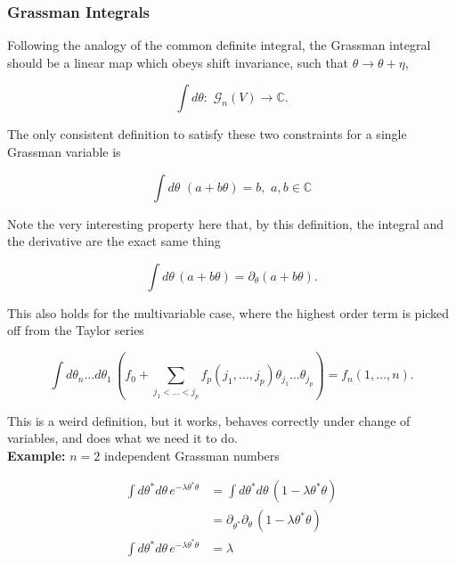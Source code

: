 \subsubsection*{Grassman Integrals}

\noindent Following the analogy of the common definite integral, the Grassman integral should be a linear map which obeys shift invariance, such that $\theta \rightarrow \theta + \eta$,

\begin{equation}
\int d\theta : \,\, \mathcal{G}_n (V) \rightarrow \mathbb{C}.
\end{equation}

\noindent The only consistent definition to satisfy these two constraints for a single Grassman variable is 

\begin{equation}
\int d\theta \,\, (a + b \theta) = b, \,\, a,b \in \mathbb{C}
\end{equation}

\noindent Note the very interesting property here that, by this definition, the integral and the derivative are the exact same thing

\begin{equation}
\int d\theta \, (a + b \theta) = \partial_\theta (a + b \theta).
\end{equation}

\noindent This also holds for the multivariable case, where the highest order term is picked off from the Taylor series

\begin{equation}
\int d\theta_n \dots d\theta_1 \, (f_0 + \sum_{j_1 < \dots < j_p} f_p (j_1, \dots, j_p) \theta_{j_1} \dots \theta_{j_p}) = f_n (1, \dots, n).
\end{equation}

\noindent This is a weird definition, but it works, behaves correctly under change of variables, and does what we need it to do. \\

\textbf{Example:}  $n=2$ independent Grassman numbers

\begin{align}
\int d\theta^* d\theta \, e^{-\lambda \theta^* \theta} &= \int d\theta^* d\theta \, (1-\lambda \theta^* \theta) \\
&= \partial_{\theta^*} \partial_\theta \, (1 - \lambda \theta^* \theta) \\
\int d\theta^* d\theta \, e^{-\lambda \theta^* \theta} &= \lambda
\end{align}

